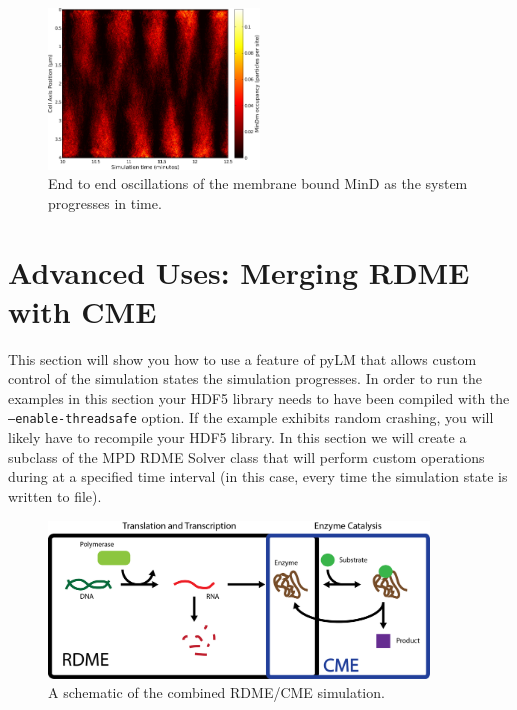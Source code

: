 \begin{figure}[h!]
  \centering
        \includegraphics[width=0.5\textwidth]{Figures/mindm.pdf}
        \caption{End to end oscillations of the membrane bound MinD as the system progresses in time.} \label{fig:kymographs}
\end{figure}

\section{Advanced Uses: Merging RDME with CME}

This section will show you how to use a feature of pyLM that allows custom control of the simulation states the simulation progresses.  In order to run the examples in this section your HDF5 library needs to have been compiled with the \texttt{--enable-threadsafe} option.  If the example exhibits random crashing, you will likely have to recompile your HDF5 library.  In this section we will create a subclass of the MPD RDME Solver class that will perform custom operations during at a specified time interval (in this case, every time the simulation state is written to file).  \\

\begin{figure}[h!]
  \centering
        \includegraphics[width=0.9\textwidth]{Figures/CombinedSchematic.png}
        \caption{A schematic of the combined RDME/CME simulation.  } \label{fig:advancedSchematic}
\end{figure}


